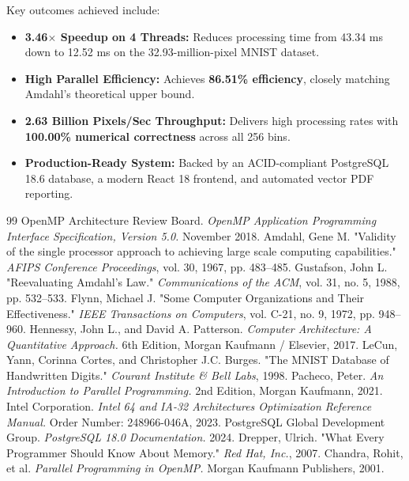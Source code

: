 \documentclass[12pt,a4paper,oneside]{report}
\begin{document}
Key outcomes achieved include:
\begin{itemize}
    \item \textbf{3.46$\times$ Speedup on 4 Threads:} Reduces processing time from 43.34 ms down to 12.52 ms on the 32.93-million-pixel MNIST dataset.
    \item \textbf{High Parallel Efficiency:} Achieves \textbf{86.51\% efficiency}, closely matching Amdahl's theoretical upper bound.
    \item \textbf{2.63 Billion Pixels/Sec Throughput:} Delivers high processing rates with \textbf{100.00\% numerical correctness} across all 256 bins.
    \item \textbf{Production-Ready System:} Backed by an ACID-compliant PostgreSQL 18.6 database, a modern React 18 frontend, and automated vector PDF reporting.
\end{itemize}

\begin{thebibliography}{99}
 OpenMP Architecture Review Board. \textit{OpenMP Application Programming Interface Specification, Version 5.0.} November 2018.
 Amdahl, Gene M. "Validity of the single processor approach to achieving large scale computing capabilities." \textit{AFIPS Conference Proceedings}, vol. 30, 1967, pp. 483--485.
 Gustafson, John L. "Reevaluating Amdahl's Law." \textit{Communications of the ACM}, vol. 31, no. 5, 1988, pp. 532--533.
 Flynn, Michael J. "Some Computer Organizations and Their Effectiveness." \textit{IEEE Transactions on Computers}, vol. C-21, no. 9, 1972, pp. 948--960.
 Hennessy, John L., and David A. Patterson. \textit{Computer Architecture: A Quantitative Approach.} 6th Edition, Morgan Kaufmann / Elsevier, 2017.
 LeCun, Yann, Corinna Cortes, and Christopher J.C. Burges. "The MNIST Database of Handwritten Digits." \textit{Courant Institute \& Bell Labs}, 1998.
 Pacheco, Peter. \textit{An Introduction to Parallel Programming.} 2nd Edition, Morgan Kaufmann, 2021.
 Intel Corporation. \textit{Intel 64 and IA-32 Architectures Optimization Reference Manual.} Order Number: 248966-046A, 2023.
 PostgreSQL Global Development Group. \textit{PostgreSQL 18.0 Documentation.} 2024.
 Drepper, Ulrich. "What Every Programmer Should Know About Memory." \textit{Red Hat, Inc.}, 2007.
 Chandra, Rohit, et al. \textit{Parallel Programming in OpenMP.} Morgan Kaufmann Publishers, 2001.
\end{thebibliography}
\end{document}
